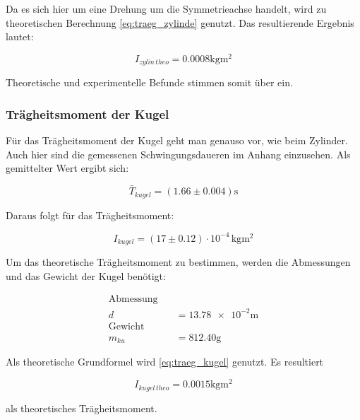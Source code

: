 Da es sich hier um eine Drehung um die Symmetrieachse handelt, wird zu
theoretischen Berechnung \eqref{eq:traeg_zylinde} genutzt.
Das resultierende Ergebnis lautet:

\begin{equation}
\label{eq:traeg_zylinder_theo}
I_{zylin \,theo}= \num{0.0008}\si{\kilogram\meter\squared}
\end{equation}

Theoretische und experimentelle Befunde stimmen somit über ein. %

\subsubsection{Trägheitsmoment der Kugel}

Für das Trägheitsmoment der Kugel geht man genauso vor, wie beim Zylinder. %
 Auch hier sind die gemessenen Schwingungsdaueren im Anhang einzusehen.
Als gemittelter Wert ergibt sich:

\begin{equation*}
\bar{T}_{kugel}=\left(\num{1.66}\pm\num{0.004}\right)\si{\second}
\end{equation*}

Daraus folgt für das Trägheitsmoment:

\begin{equation}
\label{eq:traeg_kugel_exp}
I_{kugel}=\left(\num{17}\pm\num{0.12}\right)\cdot10^{-4} \, \si{\kilogram\meter\squared}
\end{equation}

Um das theoretische Trägheitsmoment zu bestimmen, werden die Abmessungen und das Gewicht der Kugel benötigt:

\begin{align*}
\text{Abmessung} \quad &\\
d&=\num{13.78e-2}\si{\meter}\\
\text{Gewicht} \quad &\\
m_{ku}&=\num{812.40}\si{\gram}
\end{align*}

Als theoretische Grundformel wird \eqref{eq:traeg_kugel} genutzt.
Es resultiert

\begin{equation}
\label{eq:traeg_kugel_theo}
I_{kugel \,theo}= \num{0.0015}\si{\kilogram\meter\squared}
\end{equation}

als theoretisches Trägheitsmoment.

